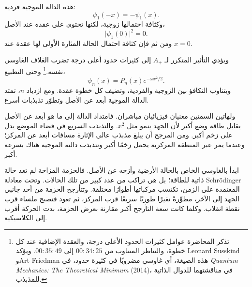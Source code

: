 هذه الدالة الموجية فردية:
\begin{equation}
\psi_{1}(-x)=-\psi_{1}(x).
\end{equation}
وكثافة احتمالها زوجية، لكنها تحتوي على عقدة عند الأصل،
\begin{equation}
\lvert\psi_{1}(0)\rvert^{2}=0.
\end{equation}
ومن ثم فإن كثافة احتمال الحالة المثارة الأولى لها عقدة عند \(x=0\).

ويؤدي التأثير المتكرر لـ \(A_{+}\) إلى كثيرات حدود أعلى درجة تضرب الغلاف الغاوسي نفسه.\footnote{تذكر المحاضرة عوامل كثيرات الحدود الأعلى درجة، والعقدة الإضافية عند كل خطوة، والتناظر المتناوب من \(00{:}34{:}25\) إلى \(00{:}35{:}49\). ويؤكد Leonard Susskind وArt Friedman هذه الصيغة، أي غاوسي مضروبًا في كثيرة حدود، في \emph{Quantum Mechanics: The Theoretical Minimum} (2014)، في مناقشتهما للدوال الذاتية للمذبذب.} وحتى التطبيع،
\begin{equation}
\psi_{n}(x)=P_{n}(x)e^{-\omega x^{2}/2}.
\end{equation}
ويتناوب التكافؤ بين الزوجية والفردية، وتضيف كل خطوة عقدة. ومع ازدياد \(n\)، تمتد الدالة الموجية أبعد عن الأصل وتطوّر تذبذبات أسرع.

ولهاتين السمتين معنيان فيزيائيان مباشران. فامتداد الدالة إلى ما هو أبعد عن الأصل يقابل طاقة وضع أكبر لأن الجهد ينمو مثل \(x^{2}\). والتذبذب السريع في فضاء الموضع يدل على زخم أكبر. ومن المرجح أن يبلغ مذبذب عالي الإثارة مسافات أبعد عن المركز؛ وعندما يمر عبر المنطقة المركزية يحمل زخمًا أكبر وتتذبذب دالته الموجية هناك بسرعة أكبر.

\begin{classroomqa}
\end{classroomqa}

ابدأ بالغاوسي الخاص بالحالة الأرضية وأزحه عن الأصل. فالحزمة المزاحة لم تعد حالة ذاتية للطاقة؛ بل هي تراكب من عدد كبير من تلك الحالات. وتحت معادلة Schr\"odinger المعتمدة على الزمن، تكتسب مركباتها أطوارًا مختلفة. وتتأرجح الحزمة من أحد جانبي الجهد إلى الآخر، مطوِّرةً تغيرًا طوريًا سريعًا قرب المركز، ثم تعود فتصبح ملساء قرب نقطة انقلاب. وكلما كانت سعة التأرجح أكبر مقارنة بعرض الحزمة، بدت الحركة أقرب إلى الكلاسيكية.

\begin{classroomqa}
\end{classroomqa}

